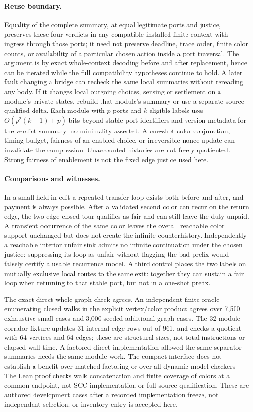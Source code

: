 \documentclass{article}
\begin{document}
\paragraph{Reuse boundary.}
Equality of the complete summary, at equal legitimate ports and
justice, preserves these four verdicts in any compatible installed
finite context with ingress through those ports; it need not preserve
deadline, trace order, finite color counts, or availability of
a particular chosen action inside a port traversal. The argument is
by exact whole-context decoding before and after replacement, hence can
be iterated while the full compatibility hypotheses continue to hold.
A later fault changing a bridge can recheck the same local summaries
without rereading any body. If it changes local outgoing choices,
sensing or settlement on a module's private states, rebuild that
module's summary or use a separate source-qualified delta.
Each module with \(p\) ports and \(k\) eligible labels uses
\(O(p^2(k+1)+p)\) bits beyond stable port identifiers and version
metadata for the verdict summary; no minimality asserted.
A one-shot color conjunction, timing budget, fairness of an enabled
choice, or irreversible nonce update can invalidate the compression.
Unaccounted histories are not freely quotiented. Strong fairness
of enablement is not the fixed edge justice used here.

\paragraph{Comparisons and witnesses.}
In a small held-in edit a repeated transfer loop exists both before
and after, and payment is always possible. After a validated second
color can recur on the return edge, the two-edge closed tour qualifies
as fair and can still leave the duty unpaid. A transient occurrence of
the same color leaves the overall reachable color support unchanged
but does not create the infinite counterhistory. Independently a
reachable interior unfair sink admits no infinite continuation
under the chosen justice: suppressing its loop as unfair without
flagging the bad prefix would falsely certify a usable recurrence
model. A third control places the two labels on mutually exclusive
local routes to the same exit: together they can sustain a fair
loop when returning to that stable port, but not in a one-shot prefix.

The exact direct whole-graph check agrees. An independent finite
oracle enumerating closed walks in the explicit vertex/color
product agrees over 7,500 exhaustive small cases and 3,000
seeded additional graph cases. The 32-module corridor fixture
updates 31 internal edge rows out of 961, and checks a quotient
with 64 vertices and 64 edges; these are structural sizes, not
total instructions or elapsed wall time. A factored direct
implementation allowed the same separator summaries needs the same
module work. The compact interface does not establish a benefit over
matched factoring or over all dynamic model checkers.
The Lean proof checks walk concatenation and finite coverage of
colors at a common endpoint, not SCC implementation or full
source qualification. These are authored development cases
after a recorded implementation freeze, not independent selection.
or inventory entry is accepted here.
\end{document}
